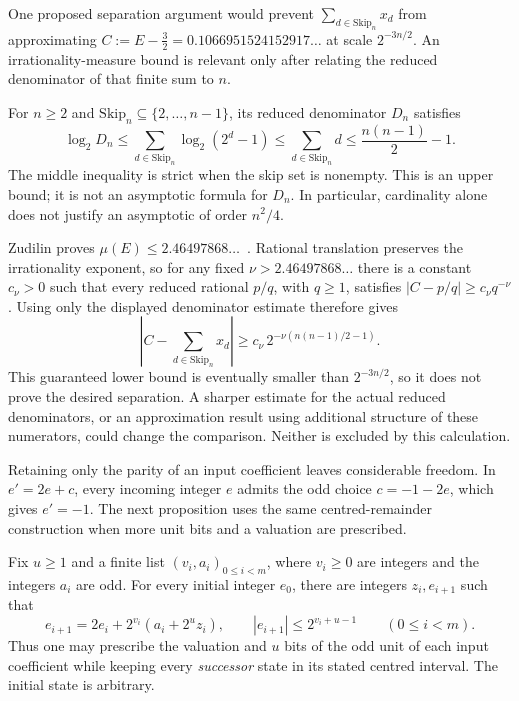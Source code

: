 \begin{obs}
\label{obs:irrationality-measure}
One proposed separation argument would prevent
$\sum_{d\in\mathrm{Skip}_n}x_d$ from approximating
$C:=E-\tfrac32=0.1066951524152917\ldots$ at scale $2^{-3n/2}$.
An irrationality-measure bound is relevant only after relating the
reduced denominator of that finite sum to $n$.

For $n\ge2$ and $\mathrm{Skip}_n\subseteq\{2,\ldots,n-1\}$, its
reduced denominator $D_n$ satisfies
\[
 \log_2 D_n\le\sum_{d\in\mathrm{Skip}_n}\log_2(2^d-1)
 \le\sum_{d\in\mathrm{Skip}_n}d
 \le\frac{n(n-1)}2-1.
\]
The middle inequality is strict when the skip set is nonempty.
This is an upper bound; it is not an asymptotic formula for $D_n$.
In particular, cardinality alone does not justify an asymptotic of
order $n^2/4$.

Zudilin proves $\mu(E)\le2.46497868\ldots$~\cite[Theorem~1, p.~154]{zudilin2004}.
Rational translation preserves the irrationality exponent, so for
any fixed $\nu>2.46497868\ldots$ there is a constant $c_\nu>0$
such that every reduced rational $p/q$, with $q\ge1$, satisfies
$|C-p/q|\ge c_\nu q^{-\nu}$.
Using only the displayed denominator estimate therefore gives
\[
 \left|C-\sum_{d\in\mathrm{Skip}_n}x_d\right|
 \ge c_\nu\,2^{-\nu(n(n-1)/2-1)}.
\]
This guaranteed lower bound is eventually smaller than $2^{-3n/2}$,
so it does not prove the desired separation.  A sharper estimate
for the actual reduced denominators, or an approximation result
using additional structure of these numerators, could change the
comparison.  Neither is excluded by this calculation.
\end{obs}

Retaining only the parity of an input coefficient leaves considerable
freedom.  In $e'=2e+c$, every incoming integer $e$ admits the odd
choice $c=-1-2e$, which gives $e'=-1$.  The next proposition uses
the same centred-remainder construction when more unit bits and
a valuation are prescribed.

\begin{prop}
\label{prop:2adic-nogo}
Fix $u\ge1$ and a finite list $(v_i,a_i)_{0\le i<m}$, where
$v_i\ge0$ are integers and the integers $a_i$ are odd.  For every
initial integer $e_0$, there are integers $z_i,e_{i+1}$ such that
\[
 e_{i+1}=2e_i+2^{v_i}(a_i+2^u z_i),\qquad
 |e_{i+1}|\le2^{v_i+u-1}\qquad(0\le i<m).
\]
Thus one may prescribe the valuation and $u$ bits of the odd unit
of each input coefficient while keeping every \emph{successor}
state in its stated centred interval.  The initial state is arbitrary.
\end{prop}

